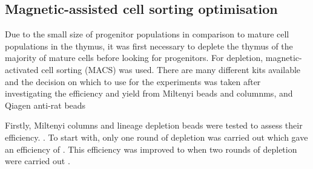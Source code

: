 \subsection{Magnetic-assisted cell sorting optimisation}

Due to the small size of progenitor populations in comparison to mature cell populations in the thymus, it was first necessary to deplete the thymus of the majority of mature cells before looking for progenitors.
For depletion, magnetic-activated cell sorting (MACS) was used.
There are many different kits available and the decision on which to use for the experiments was taken after investigating the efficiency and yield from Miltenyi beads and columnms, and Qiagen anti-rat beads 

Firstly, Miltenyi columns and lineage depletion beads were tested to assess their efficiency. 
.
To start with, only one round of depletion was carried out which gave an efficiency of .
This efficiency was improved to  when two rounds of depletion were carried out . 
